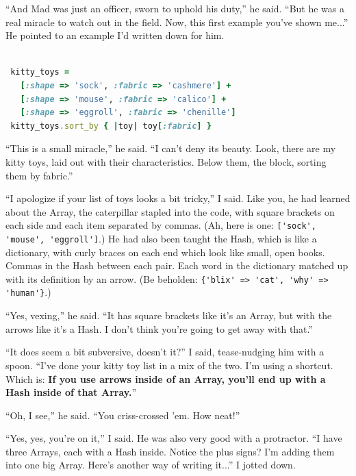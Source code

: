 \documentclass[10pt,twoside]{report}
\begin{document}
``And Mad was just an officer, sworn to uphold his duty,'' he said.
``But he was a real miracle to watch out in the field.  Now, this
first example you've shown me...''  He pointed to an example I'd
written down for him.


\begin{lstlisting}[basicstyle=\ttfamily\color{basiccolor},
    commentstyle = \ttfamily\color{commentcolor},
    keywordstyle=\ttfamily\color{keywordscolor},
    stringstyle=\color{stringcolor},
    language=Ruby,
    basicstyle=\small\ttfamily,
    showstringspaces=false,
  ]

 kitty_toys = 
   [:shape => 'sock', :fabric => 'cashmere'] +
   [:shape => 'mouse', :fabric => 'calico'] +
   [:shape => 'eggroll', :fabric => 'chenille'] 
 kitty_toys.sort_by { |toy| toy[:fabric] }

\end{lstlisting}


``This is a small miracle,'' he said. ``I can't deny its beauty.
Look, there are my kitty toys, laid out with their characteristics.
Below them, the block, sorting them by fabric.''

``I apologize if your list of toys looks a bit tricky,'' I said.  Like
you, he had learned about the Array, the caterpillar stapled into the
code, with square brackets on each side and each item separated by
commas.  (Ah, here is one: 
\lstinline[breaklines=true]|['sock', 'mouse', 'eggroll']|.) 
He had also been taught the Hash, which is like a dictionary, with
curly braces on each end which look like small, open books.  Commas in
the Hash between each pair.  Each word in the dictionary matched up
with its definition by an arrow.  (Be beholden:
\lstinline[breaklines=true]|{'blix' => 'cat', 'why' => 'human'}|.)

``Yes, vexing,'' he said.  ``It has square brackets like it's an
Array, but with the arrows like it's a Hash. I don't think you're
going to get away with that.''

``It does seem a bit subversive, doesn't it?''  I said, tease-nudging
him with a spoon.  ``I've done your kitty toy list in a mix of the
two.  I'm using a shortcut.  Which is: {\bf If you use arrows inside
  of an Array, you'll end up with a Hash inside of that Array.}''

``Oh, I see,'' he said.  ``You criss-crossed 'em.  How neat!''

``Yes, yes, you're on it,'' I said.  He was also very good with a
protractor.  ``I have three Arrays, each with a Hash inside.  Notice
the plus signs?  I'm adding them into one big Array.  Here's another
way of writing it...''  I jotted down.
\end{document}
